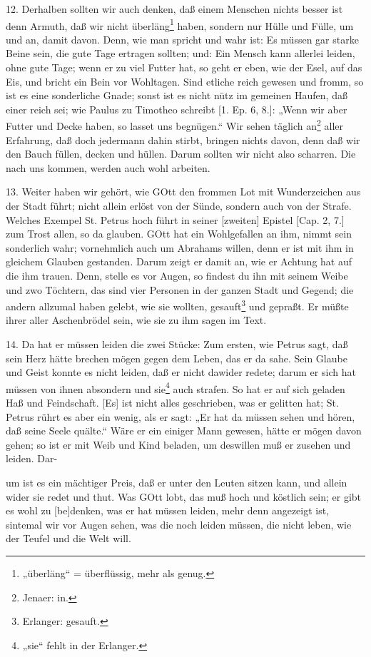 12. Derhalben sollten wir auch denken, daß einem Menschen nichts besser ist denn Armuth, daß wir nicht überläng\footnote{„überläng“ = überflüssig, mehr als genug.} haben, sondern nur Hülle und Fülle, um und an, damit davon.
Denn, wie man spricht und wahr ist: Es müssen gar starke Beine sein, die gute Tage ertragen sollten; und: Ein Mensch kann allerlei leiden, ohne gute Tage; wenn er zu viel Futter hat, so geht er eben, wie der Esel, auf das Eis, und bricht ein Bein vor Wohltagen. Sind etliche reich gewesen und fromm, so ist es eine sonderliche Gnade; sonst ist es nicht nütz im gemeinen Haufen, daß einer reich sei; wie Paulus zu Timotheo schreibt [1. Ep. 6, 8.]: „Wenn wir aber Futter und Decke haben, so lasset uns begnügen.“ Wir sehen täglich an\footnote{Jenaer: in.} aller Erfahrung, daß doch jedermann dahin stirbt, bringen nichts davon, denn daß wir den Bauch füllen, decken und hüllen. Darum sollten wir nicht also scharren. Die nach uns kommen, werden auch wohl arbeiten.

13. Weiter haben wir gehört, wie GOtt den frommen Lot mit Wunderzeichen aus der Stadt führt; nicht allein erlöst von der Sünde, sondern auch von der Strafe. Welches Exempel St. Petrus hoch führt in seiner [zweiten] Epistel [Cap. 2, 7.] zum Trost allen, so da glauben. GOtt hat ein Wohlgefallen an ihm, nimmt sein sonderlich wahr; vornehmlich auch um Abrahams willen, denn er ist mit ihm in gleichem Glauben gestanden. Darum zeigt er damit an, wie er Achtung hat auf die ihm trauen. Denn, stelle es vor Augen, so findest du ihn mit seinem Weibe und zwo Töchtern, das sind vier Personen in der ganzen Stadt und Gegend; die andern allzumal haben gelebt, wie sie wollten, gesauft\footnote{Erlanger: gesauft.} und gepraßt. Er müßte ihrer aller Aschenbrödel sein, wie sie zu ihm sagen im Text.

14. Da hat er müssen leiden die zwei Stücke: Zum ersten, wie Petrus sagt, daß sein Herz hätte brechen mögen gegen dem Leben, das er da sahe. Sein Glaube und Geist konnte es nicht leiden, daß er nicht dawider redete; darum er sich hat müssen von ihnen absondern und sie\footnote{„sie“ fehlt in der Erlanger.} auch strafen. So hat er auf sich geladen Haß und Feindschaft. [Es] ist nicht alles geschrieben, was er gelitten hat; St. Petrus rührt es aber ein wenig, als er sagt: „Er hat da müssen sehen und hören, daß seine Seele quälte.“ Wäre er ein einiger Mann gewesen, hätte er mögen davon gehen; so ist er mit Weib und Kind beladen, um deswillen muß er zusehen und leiden. Dar-

um ist es ein mächtiger Preis, daß er unter den Leuten sitzen kann, und allein wider sie redet und thut. Was GOtt lobt, das muß hoch und köstlich sein; er gibt es wohl zu [be]denken, was er hat müssen leiden, mehr denn angezeigt ist, sintemal wir vor Augen sehen, was die noch leiden müssen, die nicht leben, wie der Teufel und die Welt will.

